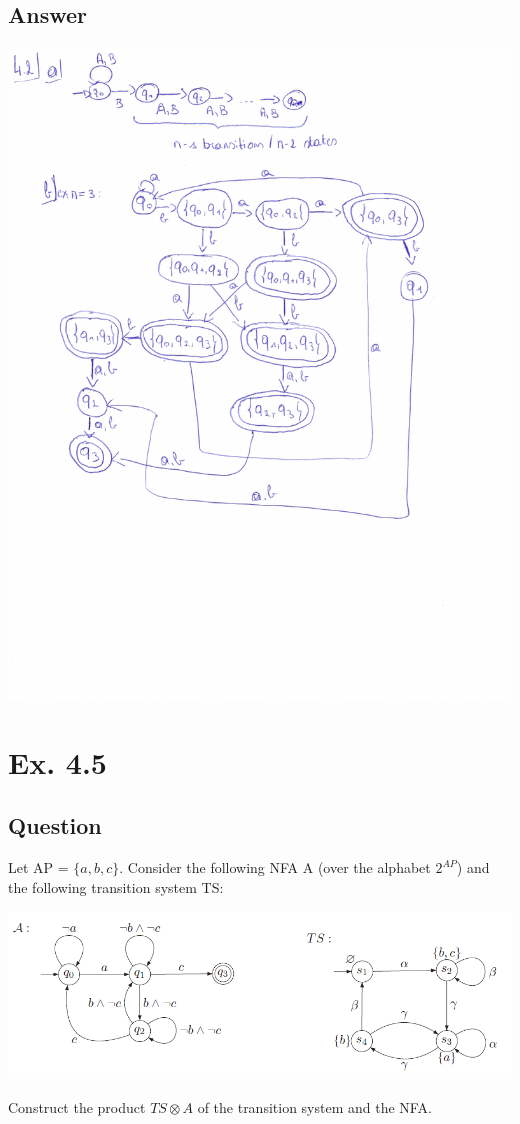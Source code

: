 \documentclass[12pt]{article}
\begin{document}
\subsection*{Answer}
\begin{centering}
	\includegraphics*[scale=0.7]{ex2.pdf}
\end{centering}

\section*{Ex. 4.5}
\subsection*{Question}
Let AP = $\{ a, b, c \}$. Consider the following NFA A (over the alphabet $2^{AP}$) and
the following transition system TS:\\
\begin{centering}
	\includegraphics*[scale=0.7]{ex45.PNG}
\end{centering}
Construct the product $TS \otimes A$ of the transition system and the NFA.
\end{document}
